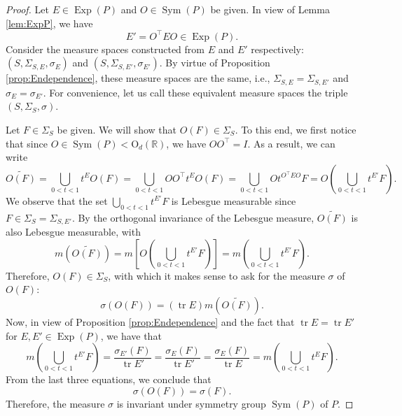 \documentclass[11pt]{article}
\theoremstyle{theorem}
\newcommand\OdR{\mbox{O}_d(\mathbb{R})} %
\newcommand\Sym{\operatorname{Sym}}
\newcommand\Exp{\operatorname{Exp}}
\newcommand\tr{\operatorname{tr}}
\newcommand{\lp}{\left(}
\newcommand{\rp}{\right)}
\newcommand{\lb}{\left[}
\newcommand{\rb}{\right]}
\begin{document}
\begin{proof}
Let $E\in \Exp(P)$ and $O\in \Sym(P)$ be given. In view of Lemma \ref{lem:ExpP}, we have 
\begin{equation*}
    E' = O^\top E O \in \Exp(P).
\end{equation*}
Consider the measure spaces constructed from $E$ and $E'$ respectively: $(S, \Sigma_{S,E},\sigma_E)$ and $(S,\Sigma_{S,E'},\sigma_{E'})$. By virtue of Proposition \ref{prop:Endependence}, these measure spaces are the same, i.e., $\Sigma_{S,E} = \Sigma_{S,E'}$ and $\sigma_{E} = \sigma_{E'}$. For convenience, let us call these equivalent measure spaces the triple $(S,\Sigma_S,\sigma)$. 

Let $F\in \Sigma_S$ be given. We will show that $O(F)\in \Sigma_S$. To this end, we first notice that since $O\in \Sym(P) < \OdR$, we have $O O^\top = I$. As a result, we can write
\begin{equation*}
    \widetilde{O(F)} = \bigcup_{0<t<1}t^E O(F) = \bigcup_{0<t<1} O O^\top t^E O(F) = \bigcup_{0<t<1}O t^{O^\top E O} F = O\lp \bigcup_{0<t<1}t^{E'} F\rp.
\end{equation*}
We observe that the set $\bigcup_{0<t<1} t^{E'}F$ is Lebesgue measurable since $F\in \Sigma_S = \Sigma_{S,E'}$. By the orthogonal invariance of the Lebesgue measure, $\widetilde{O(F)}$ is also Lebesgue measurable, with
\begin{equation*}
    m (\widetilde{O(F)} ) = m\lb O \lp \bigcup_{0<t<1}t^{E'}F \rp \rb =  m\lp \bigcup_{0<t<1}t^{E'}F \rp.
\end{equation*}
Therefore, $O(F)\in \Sigma_S$, with which it makes sense to ask for the measure $\sigma$ of $O(F)$:
\begin{equation*}
    \sigma(O(F)) = (\tr E)m(\widetilde{O(F)}).
\end{equation*}
Now, in view of Proposition \ref{prop:Endependence} and the fact that $\tr E = \tr E'$ for $E,E'\in \Exp(P)$, we have that
\begin{equation*}
    m\lp \bigcup_{0<t<1}t^{E'}F \rp = \frac{\sigma_{E'}(F)}{\tr E' }  
    = 
    \frac{\sigma_E(F)}{\tr E'} =  \frac{\sigma_E(F)}{\tr E}   = m\lp \bigcup_{0<t<1} t^E F  \rp.
\end{equation*}
From the last three equations, we conclude that 
\begin{equation*}
    \sigma(O(F)) = \sigma(F).
\end{equation*}
Therefore, the measure $\sigma$ is invariant under symmetry group $\Sym(P)$ of $P$.  
\end{proof}
\end{document}
